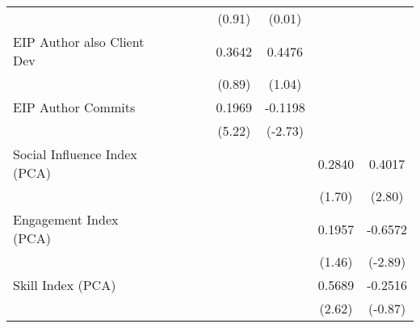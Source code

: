 {\begin{tabular}{l*{8}{c}}
                                   &                   &                   &                   &                   &    (0.91)         &    (0.01)         &                   &                   \\
[1em]
EIP Author also Client Dev         &                   &                   &                   &                   &    0.3642         &    0.4476         &                   &                   \\
                                   &                   &                   &                   &                   &    (0.89)         &    (1.04)         &                   &                   \\
[1em]
EIP Author Commits                 &                   &                   &                   &                   &    0.1969\sym{***}&   -0.1198\sym{***}&                   &                   \\
                                   &                   &                   &                   &                   &    (5.22)         &   (-2.73)         &                   &                   \\
[1em]
Social Influence Index (PCA)       &                   &                   &                   &                   &                   &                   &    0.2840\sym{*}  &    0.4017\sym{***}\\
                                   &                   &                   &                   &                   &                   &                   &    (1.70)         &    (2.80)         \\
[1em]
Engagement Index (PCA)             &                   &                   &                   &                   &                   &                   &    0.1957         &   -0.6572\sym{***}\\
                                   &                   &                   &                   &                   &                   &                   &    (1.46)         &   (-2.89)         \\
[1em]
Skill Index (PCA)                  &                   &                   &                   &                   &                   &                   &    0.5689\sym{***}&   -0.2516         \\
                                   &                   &                   &                   &                   &                   &                   &    (2.62)         &   (-0.87)         \\

\end{tabular}}

